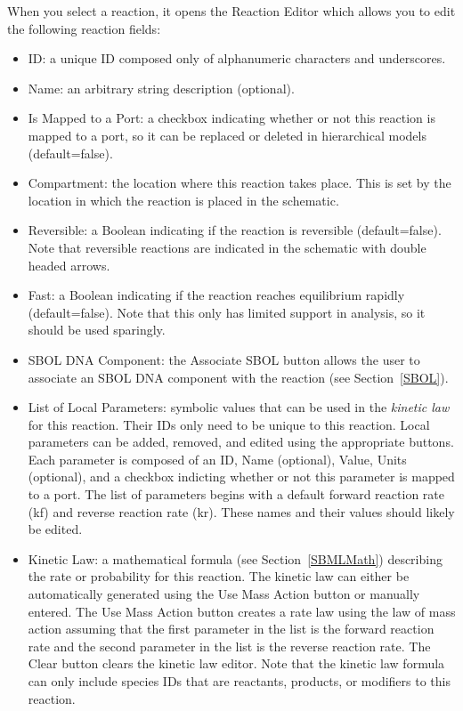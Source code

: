 \documentclass[titlepage,11pt]{article}
\begin{document}
When you select a reaction, it opens the Reaction Editor which allows you to edit the following reaction fields:
\begin{itemize}
\item ID: a unique ID composed only of alphanumeric characters and underscores.
\item Name: an arbitrary string description (optional).
\item Is Mapped to a Port: a checkbox indicating whether or not this reaction is mapped to a port, so it can be replaced or deleted in hierarchical models (default=false).
\item Compartment: the location where this reaction takes place.  This is set by the location in which the reaction is placed in the schematic.
\item Reversible: a Boolean indicating if the reaction is reversible (default=false).  Note that reversible reactions are indicated in the schematic with double headed arrows.
\item Fast: a Boolean indicating if the reaction reaches equilibrium rapidly (default=false).  Note that this only has limited support in analysis, so it should be used sparingly.
\item SBOL DNA Component: the Associate SBOL button allows the user to associate an SBOL DNA component with the reaction (see Section~\ref{SBOL}).
\item List of Local Parameters: symbolic values that can be used in the \emph{kinetic law} for this reaction.  Their IDs only need to be unique to this reaction.  Local parameters can be added, removed, and edited using the appropriate buttons.  Each parameter is composed of an ID, Name (optional), Value, Units (optional), and a checkbox indicting whether or not this parameter is mapped to a port.  The list of parameters begins with a default forward reaction rate (kf) and reverse reaction rate (kr).  These names and their values should likely be edited. 
\item Kinetic Law: a mathematical formula (see Section~\ref{SBMLMath}) describing the rate or probability for this reaction.  The kinetic law can either be automatically generated using the Use Mass Action button or manually entered.  The Use Mass Action button creates a rate law using the law of mass action assuming that the first parameter in the list is the forward reaction rate and the second parameter in the list is the reverse reaction rate.  
The Clear button clears the kinetic law editor.  Note that the kinetic law formula can only include species IDs that are reactants, products, or modifiers to this reaction.
\end{itemize}
\end{document}

